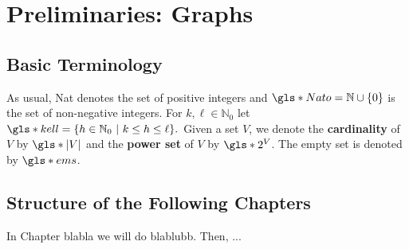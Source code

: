 \chapter{Preliminaries: Graphs}



\section{Basic Terminology} 
As usual, \gls*{Nat} denotes the set of positive integers and $\gls*{Nato} = \mathbb{N}\cup \{0\}$ is the set of non-negative integers. For $k,\ell \in \mathbb{N}_0$ let 
$\gls*{kell}=\{h \in \mathbb{N}_0 ~|~ k \leq h \leq \ell\}.$ Given a set $V$, we denote the \textbf{cardinality} of $V$ by $\gls*{|V|}$ and the \textbf{power set} of $V$ by $\gls*{2^V}$. The empty set is denoted by $\gls*{ems}$.



\section{Structure of the Following Chapters}

In Chapter blabla we will do blablubb. Then, ...